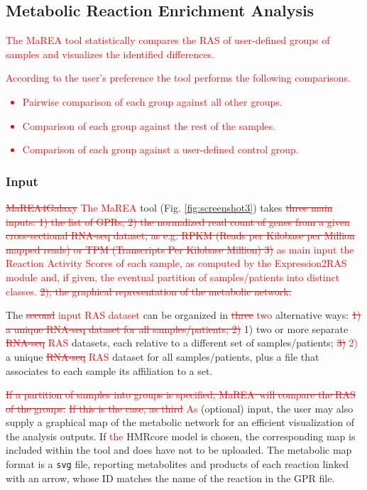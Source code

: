 \documentclass[preprint,12pt,authoryear]{elsarticle}
\newcommand{\red}{\textcolor{red}}
\newcommand{\mareagalaxy}{\textsf{MaREA4Galaxy}}
\newcommand{\mareaTool}{\textsf{MaREA}}
\newcommand{\RASTool}{\textsf{Expression2RAS}}
\begin{document}
\subsection{Metabolic Reaction Enrichment Analysis}

\red{The \mareaTool{} tool statistically compares the RAS of
  user-defined groups of samples \citep{marea} and visualizes the
  identified differences.}

\red{According to the user's preference the tool performs the
  following comparisons.
  \begin{itemize}
  \item Pairwise comparison of each group against all other groups.
  \item Comparison of each group against the rest of the samples.
  \item Comparison of each group against a user-defined control group.
  \end{itemize}}


\subsubsection{Input}

\red{\sout{\mareagalaxy} The \mareaTool{}} tool
(Fig. \ref{fig:screenshot3}) takes \red{\sout{three main inputs: 1)
    the list of GPRs; 2) the normalized read count of genes from a
    given cross-sectional RNA-seq dataset, as e.g. RPKM (Reads per
    Kilobase per Million mapped reads) or TPM (Transcripts Per
    Kilobase Million) 3)} as main input the Reaction Activity Scores
  of each sample, as computed by the \RASTool{} module and\red{, if
    given,} the eventual partition of samples/patients into distinct
  classes. \sout{2); the graphical representation of the metabolic
    network.}}

The \red{\sout{second} input RAS dataset} can be organized in
\red{\sout{three} two} alternative ways: \red{\sout{1) a unique
    RNA-seq  dataset for all samples/patients; 2)}} 1) two or more
separate \red{\sout{RNA-seq} RAS} datasets, each relative to a
different set of samples/patients; \red{\sout{3)} 2)} a unique
\red{\sout{RNA-seq} RAS} dataset for all samples/patients, plus a file
that associates to each sample its affiliation to a set.

\red{\sout{If a partition of samples into groups is specified,
    \mareaTool\ will compare the RAS of the groups.}} \red{\sout{If
    this is the case, as third} As} (optional) input, the user may
also supply a graphical map of the metabolic network for an efficient
visualization of the analysis outputs. If \red{the} \textsf{HMRcore}
model is chosen, the corresponding map is included within the tool and
does have not to be uploaded. The metabolic map format is a
\texttt{svg} file, reporting metabolites and products of each reaction
linked with an arrow, whose ID matches the name of the reaction in the
GPR file.
\end{document}
